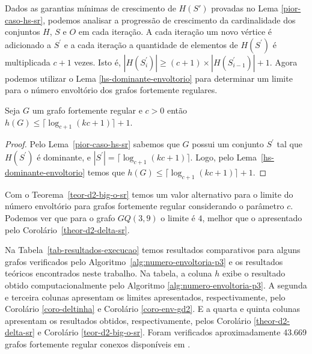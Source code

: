 Dados as garantias mínimas de crescimento de $H(S')$ provadas no Lema \ref{pior-caso-hs-sr}, podemos analisar a progressão de crescimento da cardinalidade dos conjuntos $H$, $S$ e $O$ em cada iteração. A cada iteração um novo vértice é adicionado a $S^\prime$ e a cada iteração a quantidade de elementos de $H(S^\prime)$ é multiplicada $c+1$ vezes. Isto é, $|H(S^\prime_i)| \ge (c+1) \times |H(S^\prime_{i-1})| +1$. Agora podemos utilizar o Lema \ref{hs-dominante-envoltorio} para determinar um limite para o número envoltório dos grafos fortemente regulares.

\begin{theorem}
Seja $G$ um grafo fortemente regular e $c>0$ então $h(G) \le \big \lceil \log_{c+1}(kc+1) \big \rceil + 1$.
\label{teor-d2-big-o-sr}
\end{theorem}
\begin{proof}
Pelo Lema~\ref{pior-caso-hs-sr} sabemos que $G$ possui um conjunto $S^\prime$ tal que $H(S^\prime)$ é dominante, e $|S^\prime|=\big \lceil \log_{c+1}(kc+1) \big \rceil$. Logo, pelo Lema~\ref{hs-dominante-envoltorio} temos que $h(G)\le \big \lceil \log_{c+1}(kc+1) \big \rceil + 1$.
\end{proof}


Com o Teorema~\ref{teor-d2-big-o-sr} temos um valor alternativo para o limite do número envoltório para grafos fortemente regular considerando o parâmetro $c$. Podemos ver que para o grafo $GQ(3,9)$ o limite é $4$, melhor que o apresentado pelo Corolário~\ref{theor-d2-delta-sr}.

Na Tabela~\ref{tab-resultados-execucao} temos resultados comparativos para alguns grafos verificados pelo Algoritmo~\ref{alg:numero-envoltoria-p3} e os resultados teóricos encontrados neste trabalho. Na tabela, a coluna $h$ exibe o resultado obtido computacionalmente pelo Algoritmo \ref{alg:numero-envoltoria-p3}. A segunda e terceira colunas apresentam os limites apresentados, respectivamente, pelo Corolário \ref{coro-deltinha} e Corolário \ref{coro-env-gd2}. E a quarta e quinta colunas apresentam os resultados obtidos, respectivamente, pelos Corolário \ref{theor-d2-delta-sr} e Corolário \ref{teor-d2-big-o-sr}. Foram verificados aproximadamente 43.669 grafos fortemente regular conexos disponíveis em \cite{hog2013,spence12,weisstein2018}.

